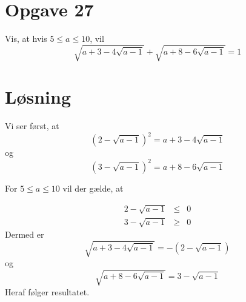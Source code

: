 \documentclass[12pt,oneside,a4paper]{article}
\newcommand{\bas}{\begin{eqnarray*}}
\newcommand{\eas}{\end{eqnarray*}}
\begin{document}
\section{Opgave 27}
Vis, at hvis $5\le a\le 10$, vil
$$
\sqrt{a+3-4\sqrt{a-1}} + \sqrt{a+8-6\sqrt{a-1}} = 1
$$

\section{Løsning}
Vi ser først, at 
$$
\left(2-\sqrt{a-1}\right)^2 = a+3-4\sqrt{a-1}
$$
og
$$
\left(3-\sqrt{a-1}\right)^2 = a+8-6\sqrt{a-1}
$$

For $5\le a\le 10$ vil der gælde, at

\bas
2-\sqrt{a-1} &\le& 0 \\
3-\sqrt{a-1} &\ge& 0 
\eas
Dermed er
$$
\sqrt{a+3-4\sqrt{a-1}} = -(2-\sqrt{a-1}) 
$$
og 
$$
\sqrt{a+8-6\sqrt{a-1}} = 3-\sqrt{a-1} 
$$
Heraf følger resultatet.
\end{document}
